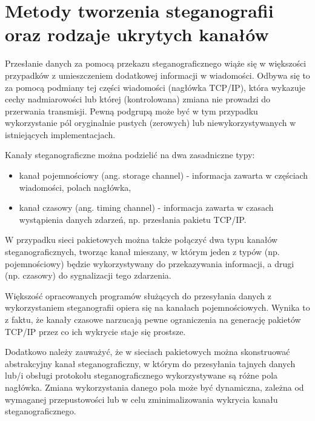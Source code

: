 \documentclass[a4paper,12pt,twoside,openany]{report}
\begin{document}
\section{Metody tworzenia steganografii oraz rodzaje ukrytych kanałów}
Przesłanie danych za pomocą przekazu steganograficznego wiąże się w większości 
przypadków z umieszczeniem dodatkowej informacji w wiadomości. Odbywa się to za 
pomocą podmiany tej części wiadomości (nagłówka TCP/IP), która wykazuje cechy 
nadmiarowości lub której (kontrolowana) zmiana nie prowadzi do przerwania 
transmisji. Pewną podgrupą może być w tym przypadku wykorzystanie pól 
oryginalnie pustych (zerowych) lub niewykorzystywanych w istniejących 
implementacjach.

Kanały steganograficzne można podzielić na dwa zasadniczne 
typy\cite{SweetyPresentation}:
\begin{itemize}
	\item kanał pojemnościowy (ang. storage channel) - informacja zawarta w 
częściach wiadomości, polach nagłówka,
	\item kanał czasowy (ang. timing channel) - informacja zawarta w czasach 
wystąpienia danych zdarzeń, np. przesłania pakietu TCP/IP.
\end{itemize}
W przypadku sieci pakietowych można także połączyć dwa typu kanałów 
steganograficznych, tworząc kanał mieszany, w którym jeden z typów (np. 
pojemnościowy) będzie wykorzystywany do przekazywania informacji, a drugi (np. 
czasowy) do sygnalizacji tego zdarzenia.

Większość opracowanych programów służących do przesyłania danych z 
wykorzystaniem steganografii opiera się na kanałach pojemnościowych. Wynika to z 
faktu, że kanały czasowe narzucają pewne ograniczenia na generację pakietów 
TCP/IP przez co ich wykrycie staje się prostsze.

Dodatkowo należy zauważyć, że w sieciach pakietowych można skonstruować 
abstrakcyjny kanał steganograficzny, w którym do przesyłania tajnych danych 
lub/i obsługi protokołu steganograficznego wykorzystywane są różne pola 
nagłówka. Zmiana wykorzystania danego pola może być dynamiczna, zależna od 
wymaganej przepustowości lub w celu zminimalizowania wykrycia kanału 
steganograficznego. 
\end{document}
